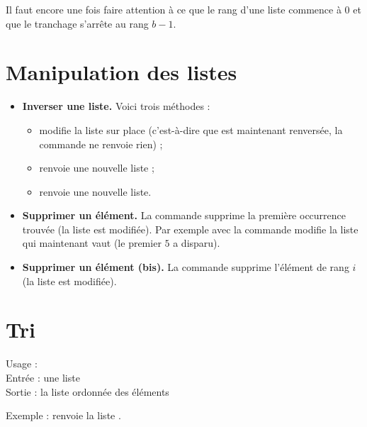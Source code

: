 \documentclass[12pt,class=report,crop=false]{standalone}
\begin{document}
  \bigskip   
  
  Il faut encore une fois faire attention à ce que le rang d'une liste commence à $0$ et que le tranchage  s'arrête au rang $b-1$.
  
  

\newpage

\section*{Manipulation des listes}

\begin{itemize}
  \item \textbf{Inverser une liste.} Voici trois méthodes :
\begin{itemize}
  \item {} modifie la liste sur place (c'est-à-dire que  est maintenant renversée, la commande ne renvoie rien) ;
  \item {} renvoie une nouvelle liste ;
  \item {} renvoie une nouvelle liste. 
\end{itemize} 

   \bigskip
  \bigskip 

  \item \textbf{Supprimer un élément.}  La commande  supprime la première occurrence trouvée (la liste est modifiée). Par exemple avec  la commande  modifie la liste qui maintenant vaut \ci{[2,3,8,5]} (le premier $5$ a disparu).
  
  \bigskip
  \bigskip 
  
   \item \textbf{Supprimer un élément (bis).}  La commande  supprime l'élément de rang $i$ (la liste est modifiée).
  
\end{itemize}


\newpage

\section*{Tri}

 
  \begin{fonctionpython}
    Usage : \\
    Entrée : une liste  \\
    Sortie : la liste ordonnée des éléments
  
  \medskip
     
   Exemple :  renvoie la liste \ci{[4,6,6,7,8,11,12,13]}.

  \end{fonctionpython}  
  
\end{document}

